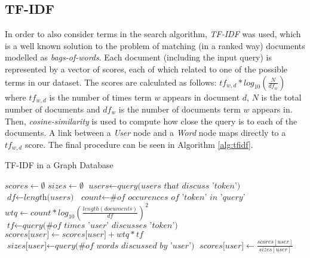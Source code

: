 \subsection{TF-IDF}


In order to also consider terms in the search algorithm, \emph{TF-IDF} was used, 
which is a well known solution to the problem of matching (in a ranked
way) documents modelled as \emph{bags-of-words}. Each document (including the
input query) is represented by a vector of scores, each of which related to one
of the possible terms in our dataset. The scores are calculated as follows:
${tf}_{w, d} * log_{10}(\frac{N}{{df}_{w}})$ where ${tf}_{w, d}$ is the number
of times term $w$ appears in document $d$, $N$ is the total number of documents
and ${df}_{w}$ is the number of documents term $w$ appears in. Then,
\emph{cosine-similarity} is used to compute how close the query is to each of
the documents. A link between a \emph{User} node and a \emph{Word} node maps
directly to a ${tf}_{w,d}$ score. The final procedure can be seen in Algorithm \ref{alg:tfidf}.


\begin{algorithm}[H]
\caption{TF-IDF in a Graph Database}\label{alg:tfidf}
\begin{algorithmic}
    \State $\textit{scores} \gets \emptyset$
    \State $\textit{sizes} \gets \emptyset$
        \State $\textit{users} \gets \textit{query(users that discuss 'token')}$
        \State $\textit{df} \gets \textit{length(users)}$
        \State $\textit{count} \gets \textit{\# of occurences of 'token' in 'query'}$
        \State $\textit{wtq} \gets \textit{$count * log_{10}(\frac{length(documents)}{df})^2$}$
        \State $\textit{tf} \gets \textit{query(\# of times 'user' discusses 'token')}$
          \State $\textit{scores[user]} \gets \textit{scores[user]} + wtq*tf$
          \State $\textit{sizes[user]} \gets \textit{query(\# of words discussed by 'user')}$
        \EndFor
    \EndFor
        \State $\textit{scores[user]} \gets \textit{$\frac{scores[user]}{sizes[user]}$}$
    \EndFor
    \State {}
\EndProcedure
\end{algorithmic}
\end{algorithm}
